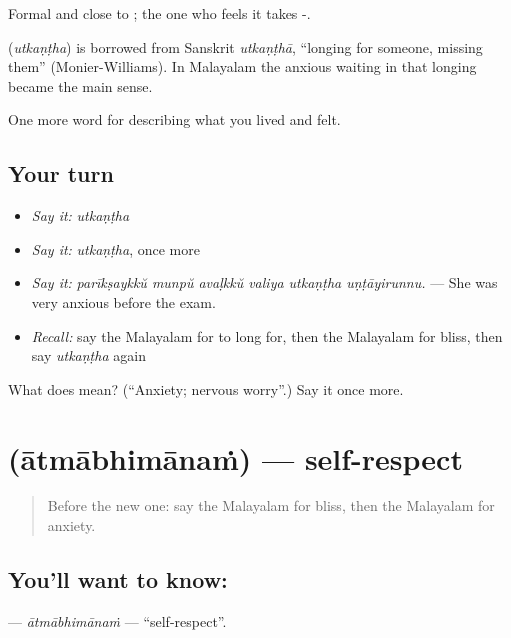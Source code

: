 Formal and close to ; the one who feels it takes -.

\begin{cousinweb}
\textbf{} (\emph{utkaṇṭha}) is borrowed from Sanskrit \emph{utkaṇṭhā}, \textquotedblleft{}longing for someone, missing them\textquotedblright{} (Monier-Williams). In Malayalam the anxious waiting in that longing became the main sense.
\end{cousinweb}

\begin{grammarlens}[title={What you've built}]
One more word for describing what you lived and felt.
\end{grammarlens}

\subsection*{Your turn}
\begin{itemize}
\raggedright
  \item \emph{Say it:} \emph{utkaṇṭha}
  \item \emph{Say it:} \emph{utkaṇṭha}, once more
  \item \emph{Say it:} \emph{parīkṣaykkŭ munpŭ avaḷkkŭ valiya utkaṇṭha uṇṭāyirunnu.} — She was very anxious before the exam.
  \item \emph{Recall:} say the Malayalam for to long for, then the Malayalam for bliss, then say \emph{utkaṇṭha} again
\end{itemize}

\begin{tcolorbox}[breakable,colback=teal!4,colframe=teal!35!black,title={Before you move on}]
What does  mean? (\textquotedblleft{}Anxiety; nervous worry\textquotedblright{}.) Say it once more.
\end{tcolorbox}
\section[\texorpdfstring{\ml{ആത്മാഭിമാനം} (ātmābhimānaṁ)}{ആത്മാഭിമാനം (ātmābhimānaṁ)}]{ (ātmābhimānaṁ) — self-respect}

\label{lesson:ML-C519-atmabhimanam}



\begin{quote}
Before the new one: say the Malayalam for bliss, then the Malayalam for anxiety.
\end{quote}

\subsection*{You'll want to know: }
\textbf{} — \emph{ātmābhimānaṁ} — \textquotedblleft{}self-respect\textquotedblright{}.

